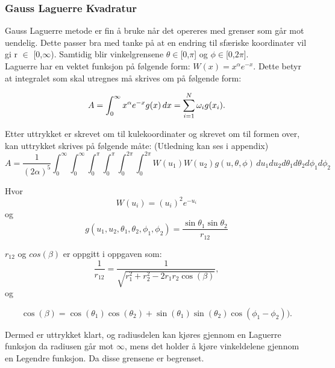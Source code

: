 \documentclass[%
oneside,                 %
final,                   %
10pt]{article}
\begin{document}
\subsubsection{Gauss Laguerre Kvadratur}
\noindent Gauss Laguerre metode er fin å bruke når det opereres med grenser som går mot uendelig. Dette passer bra med tanke på at en endring til sfæriske koordinater vil gi r $\in$ [0,$\infty$). Samtidig blir vinkelgrensene $\theta \in$[0,$\pi$] og $\phi \in$[0,$2\pi$].\\
\noindent Laguerre har en vektet funksjon på følgende form: $W(x) = x^{\alpha} e^{-x}$. Dette betyr at integralet som skal utregnes må skrives om på følgende form:

\begin{equation}
  \notag A =
  \int_0^\infty x^\alpha e^{-x} g(x) \, dx = \sum^{N}_{i=1} \omega_ig(x_i).
\end{equation}

\noindent Etter uttrykket er skrevet om til kulekoordinater og skrevet om til formen over, kan uttrykket skrives på følgende måte: (Utledning kan ses i appendix)
\begin{equation*}
    A=\frac{1}{(2\alpha)^5} \int_{0}^\infty\int_0^\infty\int_0^{\pi}\int_0^\pi\int_0^{2\pi}\int_0^{2\pi}W(u_1)W(u_2)g(u, \theta, \phi)\,du_1du_2d\theta_1d\theta_2d\phi_1d\phi_2
\end{equation*}

\noindent Hvor
\begin{equation}
    W(u_i)=(u_i)^2 e^{-u_i}
\end{equation}
\noindent og
\begin{equation}
    g(u_1, u_2, \theta_1, \theta_2, \phi_1, \phi_2) = \frac{\sin \theta_1 \sin \theta_2}{r_{12}}
\end{equation}

\noindent $r_{12}$ og $cos(\beta)$ er oppgitt i oppgaven som:
\begin{equation}
	\frac{1}{r_{12}}= \frac{1}{\sqrt{r_1^2+r_2^2-2r_1r_2\cos(\beta)}},
\end{equation}
\noindent og

\begin{equation}
	\cos(\beta) = \cos(\theta_1)\cos(\theta_2)+\sin(\theta_1)\sin(\theta_2)\cos(\phi_1-\phi_2)).
\end{equation}

\noindent Dermed er uttrykket klart, og radiusdelen kan kjøres gjennom en Laguerre funksjon da radiusen går mot $\infty$, mens det holder å kjøre vinkeldelene gjennom en Legendre funksjon. Da disse grensene er begrenset.
\end{document}
